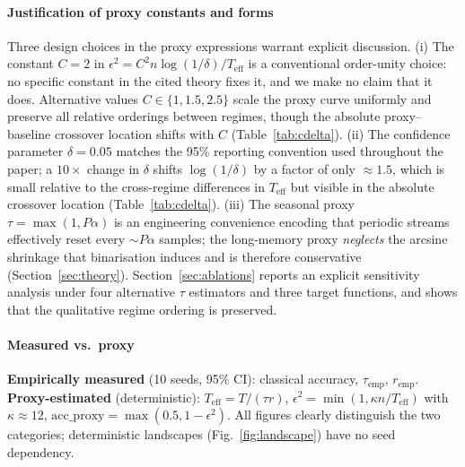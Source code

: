 \documentclass[sensors,article,submit,pdftex,moreauthors]{Definitions/mdpi}
\newcommand{\Teff}{T_{\mathrm{eff}}}
\providecommand{\DIFadd}[1]{{\protect\color{blue}#1}} %
\providecommand{\DIFdel}[1]{} %
\providecommand{\DIFaddbegin}{} %
\providecommand{\DIFaddend}{} %
\providecommand{\DIFdelbegin}{} %
\providecommand{\DIFdelend}{} %
\begin{document}
\paragraph{Justification of proxy constants and forms} Three design choices in the proxy expressions warrant explicit discussion.
(i) The constant $C = 2$ in $\epsilon^2 = C^2 n \log(1/\delta) / \Teff$ is a \DIFdelbegin \DIFdel{conservative scaling factor consistent with concentration-inequality constants in the quantum oracle sketching literature; alternative }\DIFdelend \DIFaddbegin \DIFadd{conventional order-unity choice: no specific constant in the cited theory fixes it, and we make no claim that it does. Alternative }\DIFaddend values $C \in \{1, 1.5, 2.5\}$ scale the proxy curve uniformly and preserve all relative orderings between regimes\DIFaddbegin \DIFadd{, though the absolute proxy--baseline crossover location shifts with $C$ (Table~\ref{tab:cdelta})}\DIFaddend .
(ii) The confidence parameter $\delta = 0.05$ matches the 95\% reporting convention used throughout the paper; a $10\times$ change in $\delta$ shifts $\log(1/\delta)$ by a factor of only ${\approx}1.5$, which is small relative to the cross-regime differences in $\Teff$ \DIFaddbegin \DIFadd{but visible in the absolute crossover location (Table~\ref{tab:cdelta})}\DIFaddend .
(iii) The seasonal proxy $\tau = \max(1, P\alpha)$ is an engineering convenience encoding that periodic streams effectively reset every ${\sim}P\alpha$ samples; the long-memory proxy \DIFdelbegin \DIFdel{uses an arcsine correction following }%
\DIFdel{to account for binarisation , and is acknowledged as conservative }\DIFdelend \DIFaddbegin \emph{\DIFadd{neglects}} \DIFadd{the arcsine shrinkage that binarisation induces }\citep{vanvleck1966spectrum} \DIFadd{and is therefore conservative (Section~\ref{sec:theory})}\DIFaddend . Section~\ref{sec:ablations} reports an explicit sensitivity analysis under four alternative $\tau$ estimators and three target functions, and shows that the qualitative regime ordering is preserved.

\paragraph{Measured vs.\ proxy} \textbf{Empirically measured} (10 seeds, 95\% CI): classical accuracy, $\tau_{\text{emp}}$, $r_{\text{emp}}$. \textbf{Proxy-estimated} (deterministic): $\Teff = T/(\tau r)$, $\epsilon^2 = \min(1, \kappa n/\Teff)$ with $\kappa \approx 12$, $\mathrm{acc\_proxy} = \max(0.5, 1-\epsilon^2)$. All figures clearly distinguish the two categories; deterministic landscapes (Fig.~\ref{fig:landscape}) have no seed dependency.
\end{document}
